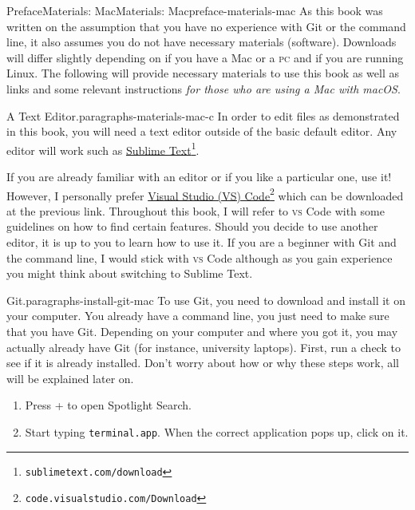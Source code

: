 \documentclass[twoside,10pt,]{book}
\newcommand{\mono}[1]{\texttt{#1}}
\newcommand{\initialism}[1]{\textsc{\MakeLowercase{#1}}}
\newcommand{\kbd}[1]{\keys{{#1}}}
\begin{document}
%
%
\typeout{************************************************}
\typeout{************************************************}
%
\begin{preface}{Preface}{Materials: Mac}{}{Materials: Mac}{}{}{preface-materials-mac}
As this book was written on the assumption that you have no experience with Git or the command line, it also assumes you do not have necessary materials (software). Downloads will differ slightly depending on if you have a Mac or a \initialism{PC} and if you are running Linux. The following will provide necessary materials to use this book as well as links and some relevant instructions \emph{for those who are using a Mac with macOS}.%
\begin{paragraphs}{A Text Editor.}{paragraphs-materials-mac-c}%
In order to edit files as demonstrated in this book, you will need a text editor outside of the basic default editor. Any editor will work such as \href{https://www.sublimetext.com/download}{Sublime Text}\footnote{\nolinkurl{sublimetext.com/download}\label{fn-materials-mac-c-b-b}}.%
\par
If you are already familiar with an editor or if you like a particular one, use it! However, I personally prefer \href{https://code.visualstudio.com/Download}{Visual Studio (VS) Code}\footnote{\nolinkurl{code.visualstudio.com/Download}\label{fn-materials-mac-c-c-b}} which can be downloaded at the previous link. Throughout this book, I will refer to \initialism{VS} Code with some guidelines on how to find certain features. Should you decide to use another editor, it is up to you to learn how to use it. If you are a beginner with Git and the command line, I would stick with \initialism{VS} Code although as you gain experience you might think about switching to Sublime Text.%
\end{paragraphs}%
\begin{paragraphs}{Git.}{paragraphs-install-git-mac}%
To use Git, you need to download and install it on your computer. You already have a command line, you just need to make sure that you have Git. Depending on your computer and where you got it, you may actually already have Git (for instance, university laptops). First, run a check to see if it is already installed. Don't worry about how or why these steps work, all will be explained later on.%
\begin{enumerate}
\item{}Press \kbd{Command} + \kbd{Space} to open Spotlight Search.%
\item{}Start typing \mono{terminal.app}. When the correct application pops up, click on it.%

\end{enumerate}
\end{paragraphs}
\end{preface}
\end{document}
